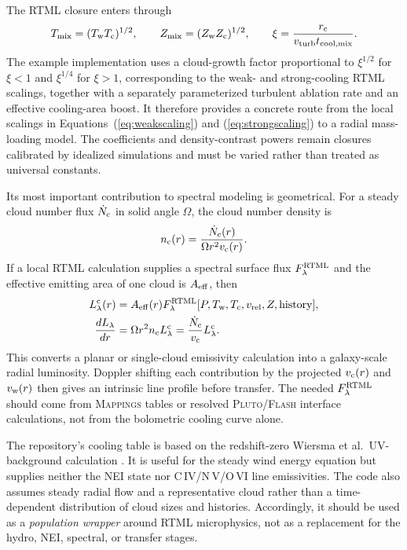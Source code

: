 \documentclass[english,a4paper]{my_memo2}
\begin{document}
The RTML closure enters through
\begin{equation}
 T_{\rm mix}=(T_{\rm w}T_{\rm c})^{1/2},\qquad
 Z_{\rm mix}=(Z_{\rm w}Z_{\rm c})^{1/2},\qquad
 \xi=\frac{r_{\rm c}}{v_{\rm turb}t_{\rm cool,mix}}.
 \label{eq:windxi}
\end{equation}
The example implementation uses a cloud-growth factor proportional to
$\xi^{1/2}$ for $\xi<1$ and $\xi^{1/4}$ for $\xi>1$, corresponding to the
weak- and strong-cooling RTML scalings, together with a separately
parameterized turbulent ablation rate and an effective cooling-area boost.
It therefore provides a concrete route from the local scalings in
Equations~(\ref{eq:weakscaling}) and (\ref{eq:strongscaling}) to a radial
mass-loading model.  The coefficients and density-contrast powers remain
closures calibrated by idealized simulations and must be varied rather than
treated as universal constants.

Its most important contribution to spectral modeling is geometrical.  For a
steady cloud number flux $\dot N_{\rm c}$ in solid angle $\Omega$, the cloud
number density is
\begin{equation}
 n_{\rm c}(r)=\frac{\dot N_{\rm c}(r)}
 {\Omega r^2v_{\rm c}(r)}.
 \label{eq:cloudnumber}
\end{equation}
If a local RTML calculation supplies a spectral surface flux
$F_\lambda^{\rm RTML}$ and the effective emitting area of one cloud is
$A_{\rm eff}$, then
\begin{align}
 L_\lambda^{\rm c}(r)&=A_{\rm eff}(r)
 F_\lambda^{\rm RTML}
 [P,T_{\rm w},T_{\rm c},v_{\rm rel},Z,\mathrm{history}],\\
 \frac{dL_\lambda}{dr}
 &=\Omega r^2 n_{\rm c}L_\lambda^{\rm c}
 =\frac{\dot N_{\rm c}}{v_{\rm c}}L_\lambda^{\rm c}.
 \label{eq:windlum}
\end{align}
This converts a planar or single-cloud emissivity calculation into a
galaxy-scale radial luminosity.  Doppler shifting each contribution by the
projected $v_{\rm c}(r)$ and $v_{\rm w}(r)$ then gives an intrinsic line
profile before transfer.  The needed
$F_\lambda^{\rm RTML}$ should come from \textsc{Mappings} tables or resolved
\textsc{Pluto}/\textsc{Flash} interface calculations, not from the
bolometric cooling curve alone.

The repository's cooling table is based on the redshift-zero
Wiersma et al.\ UV-background calculation \cite{Wiersma2009}.  It is useful
for the steady wind energy equation but supplies neither the NEI state nor
C\,IV/N\,V/O\,VI line emissivities.  The code also assumes steady radial
flow and a representative cloud rather than a time-dependent distribution of
cloud sizes and histories.  Accordingly, it should be used as a
\emph{population wrapper} around RTML microphysics, not as a replacement for
the hydro, NEI, spectral, or transfer stages.
\end{document}
